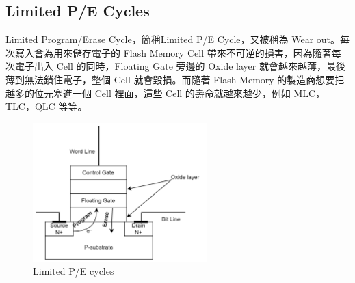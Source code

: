 \subsection{Limited P/E Cycles}\label{s2.1.4}
\indent
Limited Program/Erase Cycle，簡稱Limited P/E Cycle，又被稱為 Wear out。每次寫入會為用來儲存電子的 Flash Memory Cell 帶來不可逆的損害，因為隨著每次電子出入 Cell 的同時，Floating Gate 旁邊的 Oxide layer 就會越來越薄，最後薄到無法鎖住電子，整個 Cell 就會毀損\cite{8631191}。而隨著 Flash Memory 的製造商想要把越多的位元塞進一個 Cell 裡面，這些 Cell 的壽命就越來越少，例如 MLC，TLC，QLC 等等。
\begin{figure}[H]
    \centering
    \includegraphics[width=0.6\textwidth]{picture/ch2/Limited_P-E_Cycles.png}
    \caption{Limited P/E cycles}
    \label{f2.3}
\end{figure}

